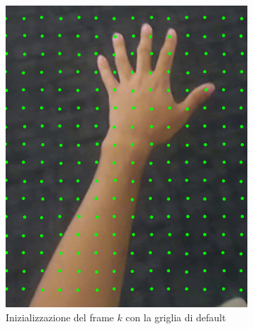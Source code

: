 \documentclass[12pt,a4paper,oneside]{article}
\begin{document}
\begin{figure}[!htb]
\begin{subfigure}[t]{.325\textwidth}
		\includegraphics[width=\textwidth]{resources/images/inizializzazioneFrameAttuale_no_memory.png}
		\captionsetup{justification=centering}
		\caption{Inizializzazione del frame $k$ con la griglia di default}
	\end{subfigure}%
	\hfill
	\begin{subfigure}[t]{.325\textwidth}

\end{subfigure}
\end{figure}
\end{document}
